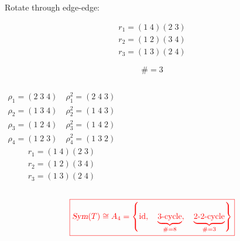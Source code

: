 \begin{frame}
  \begin{center}
	Rotate through edge-edge:
  \end{center}

  \begin{align*}
	r_1 = (1\; 4) (2\; 3) \\[6pt]
	r_2 = (1\; 2) (3\; 4) \\[6pt]
	r_3 = (1\; 3) (2\; 4)
  \end{align*}

  \pause
  \[
	\# = 3
  \]
\end{frame}

\begin{frame}
  \begin{columns}
	  \begin{align*}
		\rho_{1} = (2\; 3\; 4)\quad \rho_{1}^{2} = (2\; 4\; 3) \\[3pt]
		\rho_{2} = (1\; 3\; 4)\quad \rho_{2}^{2} = (1\; 4\; 3) \\[3pt]
		\rho_{3} = (1\; 2\; 4)\quad \rho_{3}^{2} = (1\; 4\; 2) \\[3pt]
		\rho_{4} = (1\; 2\; 3)\quad \rho_{4}^{2} = (1\; 3\; 2)
	  \end{align*}
	  \begin{align*}
		r_1 = (1\; 4) (2\; 3) \\[6pt]
		r_2 = (1\; 2) (3\; 4) \\[6pt]
		r_3 = (1\; 3) (2\; 4)
	  \end{align*}
  \end{columns}

  \vspace{0.60cm}
  \[
	\textcolor{red}{\boxed{\textsl{Sym}(T) \cong A_4 = \left\{\text{id},\quad \underbrace{\text{3-cycle}}_{\# = 8},\quad \underbrace{\text{2-2-cycle}}_{\# = 3}\right\}}}
  \]
\end{frame}


